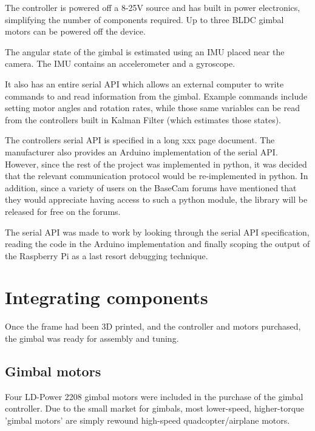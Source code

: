 The controller is powered off a 8-25V source and has built in power electronics, simplifying the number of components required. Up to three BLDC gimbal motors can be powered off the device.

The angular state of the gimbal is estimated using an IMU placed near the camera. The IMU contains an accelerometer and a gyroscope.


It also has an entire serial API which allows an external computer to write commands to and read information from the gimbal. Example commands include setting motor angles and rotation rates, while those same variables can be read from the controllers built in Kalman Filter (which estimates those states).

The controllers serial API is specified in a long {\color{red} xxx} page document. The manufacturer also provides an Arduino implementation of the serial API. However, since the rest of the project was implemented in python, it was decided that the relevant communication protocol would be re-implemented in python. In addition, since a variety of users on the BaseCam forums have mentioned that they would appreciate having access to such a python module, the library will be released for free on the forums.

The serial API was made to work by looking through the serial API specification, reading the code in the Arduino implementation and finally scoping the output of the Raspberry Pi as a last resort debugging technique.


\section{Integrating components}
Once the frame had been 3D printed, and the controller and motors purchased, the gimbal was ready for assembly and tuning.

\subsection{Gimbal motors}
Four LD-Power 2208 gimbal motors were included in the purchase of the gimbal controller. Due to the small market for gimbals, most lower-speed, higher-torque 'gimbal motors' are simply rewound high-speed quadcopter/airplane motors.

